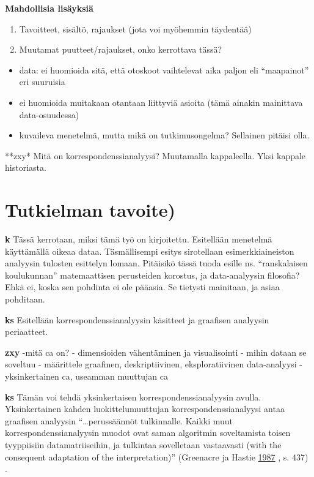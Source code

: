 \documentclass[
  finnish,
]{book}
\begin{document}
\textbf{Mahdollisia lisäyksiä}

\begin{enumerate}
\def\labelenumi{\arabic{enumi}.}
\item
  Tavoitteet, sisältö, rajaukset (jota voi myöhemmin täydentää)
\item
  Muutamat puutteet/rajaukset, onko kerrottava tässä?
\end{enumerate}

\begin{itemize}
\item
  data: ei huomioida sitä, että otoskoot vaihtelevat aika paljon eli
  ``maapainot'' eri suuruisia
\item
  ei huomioida muitakaan otantaan liittyviä asioita (tämä ainakin
  mainittava data-osuudessa)
\item
  kuvaileva menetelmä, mutta mikä on tutkimusongelma? Sellainen pitäisi
  olla.
\end{itemize}

**zxy* Mitä on korrespondenssianalyysi? Muutamalla kappaleella. Yksi
kappale historiasta.

\hypertarget{tutkielman-tavoite}{%
\section{Tutkielman tavoite)}\label{tutkielman-tavoite}}

\textbf{k} Tässä kerrotaan, miksi tämä työ on kirjoitettu. Esitellään
menetelmä käyttämällä oikeaa dataa. Täsmällisempi esitys sirotellaan
esimerkkiaineiston analyysin tulosten esittelyn lomaan. Pitäisikö tässä
tuoda esille ns. ``ranskalaisen koulukunnan'' matemaattisen perusteiden
korostus, ja data-analyysin filosofia? Ehkä ei, koska sen pohdinta ei
ole pääasia. Se tietysti mainitaan, ja asiaa pohditaan.

\textbf{ks} Esitellään korrespondenssianalyysin käsitteet ja graafisen
analyysin periaatteet.

\textbf{zxy} -mitä ca on? - dimensioiden vähentäminen ja visualisointi -
mihin dataan se soveltuu - määrittele graafinen, deskriptiivinen,
eksploratiivinen data-analyysi - yksinkertainen ca, useamman muuttujan
ca

\textbf{ks} Tämän voi tehdä yksinkertaisen korrespondenssianalyysin
avulla. Yksinkertainen kahden luokittelumuuttujan
korrespondenssianalyysi antaa graafisen analyysin ``\ldots perussäännöt
tulkinnalle. Kaikki muut korrespondenssianalyysin muodot ovat saman
algoritmin soveltamista toisen tyyppiisiin datamatriiseihin, ja
tulkintaa sovelletaan vastaavasti (with the consequent adaptation of the
interpretation)'' (Greenacre ja Hastie
\protect\hyperlink{ref-RefWorks:doc:5a857a44e4b0ed2d44664d84}{1987} , s.
437) .
\end{document}
